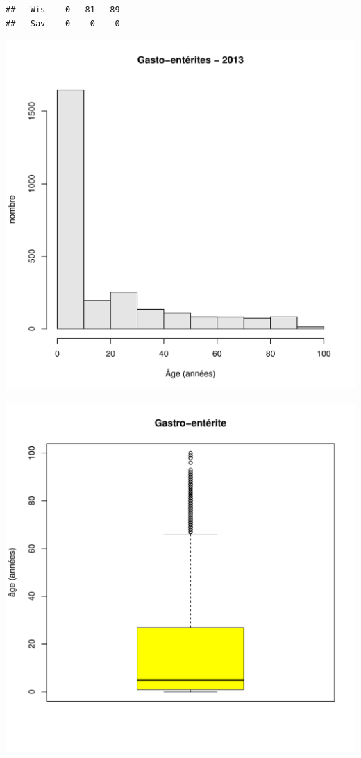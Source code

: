 \documentclass[12pt,english,french,twoside]{book}\usepackage[]{graphicx}\usepackage[]{color}
\makeatletter
\def\maxwidth{ %
  \ifdim\Gin@nat@width>\linewidth
    \linewidth
  \else
    \Gin@nat@width
  \fi
}
\newenvironment{kframe}{%
 \def\at@end@of@kframe{}%
 \ifinner\ifhmode%
  \def\at@end@of@kframe{\end{minipage}}%
  \begin{minipage}{\columnwidth}%
 \fi\fi%
 \def\FrameCommand##1{\hskip\@totalleftmargin \hskip-\fboxsep
 \colorbox{shadecolor}{##1}\hskip-\fboxsep
     \hskip-\linewidth \hskip-\@totalleftmargin \hskip\columnwidth}%
 \MakeFramed {\advance\hsize-\width
   \@totalleftmargin\z@ \linewidth\hsize
   \@setminipage}}%
 {\par\unskip\endMakeFramed%
 \at@end@of@kframe}
\newenvironment{knitrout}{}{} %
\makeatother
\begin{document}
\begin{knitrout}
\begin{kframe}
\begin{verbatim}
##   Wis    0   81   89
##   Sav    0    0    0
\end{verbatim}
\end{kframe}
\includegraphics[width=\maxwidth]{figure/ge1} 

\includegraphics[width=\maxwidth]{figure/ge2} 


\end{knitrout}
\end{document}
